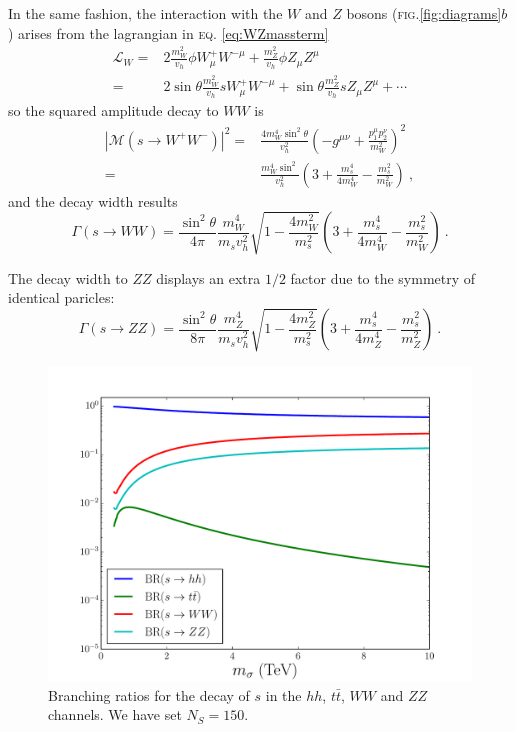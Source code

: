 \documentclass[aps,prd,preprintnumbers,nofootinbibn,twocolumn]{revtex4}
\begin{document}
In the same fashion, the interaction with the $W$ and $Z$ bosons (\textsc{fig.}\ref{fig:diagrams}$b$) arises from the lagrangian in \textsc{eq.} \eqref{eq:WZmassterm}
\begin{align}
\mathcal{L}_W =& 2 \frac{m_W^2}{v_h}\phi W^+_\mu W^{-\mu} + \frac{m_Z^2}{v_h} \phi Z_\mu Z^\mu\nonumber\\
=& 2 \sin \theta \frac{m_W^2}{v_h}s W^+_\mu W^{-\mu} + \sin\theta \frac{m_Z^2}{v_h} s Z_\mu Z^\mu + \cdots
\end{align}
so the squared amplitude decay to $WW$ is
\begin{align}
|\mathcal{M}(s\to W^+W^-)|^2 =& \frac{4 m_W^4 \sin^2\theta}{v_h^2} \left(-g^{\mu\nu}+\frac{p^\mu_1 p^\nu_2}{m_W^2} \right)^2\nonumber\\
=&  \frac{m_W^4 \sin^2 }{v_h^2} \left(3+\frac{m_s^4}{4 m_W^4}-\frac{m_s^2}{m_W^2} \right)\ ,
\end{align}
and the decay width results
\begin{equation}
\Gamma(s \rightarrow WW)=  \frac{\sin^2\theta }{4 \pi } \frac{m_W^4}{m_s v_h^2} \sqrt{ 1- \frac{4 m_W^2}{m_s^2}}
\left(3+\frac{m_s^4}{4 m_W^4}-\frac{m_s^2}{m_W^2} \right)\ .
\end{equation}

The decay width to $ZZ$ displays an extra $1/2$ factor due to the symmetry of identical paricles:
\begin{equation}
\Gamma(s \rightarrow ZZ)=  \frac{\sin^2\theta }{8 \pi } \frac{m_Z^4}{m_s v_h^2} \sqrt{ 1- \frac{4 m_Z^2}{m_s^2}}
\left(3+\frac{m_s^4}{4 m_Z^4}-\frac{m_s^2}{m_Z^2} \right)\ .
\end{equation}

\begin{figure}[b]
\centering
\includegraphics[width=\columnwidth]{BR}
\caption{Branching ratios for the decay of $s$ in the $hh$, $t\bar{t}$, $WW$ and $ZZ$ channels. We have set $N_S=150$.}\label{fig:BR}
\end{figure}
\end{document}

